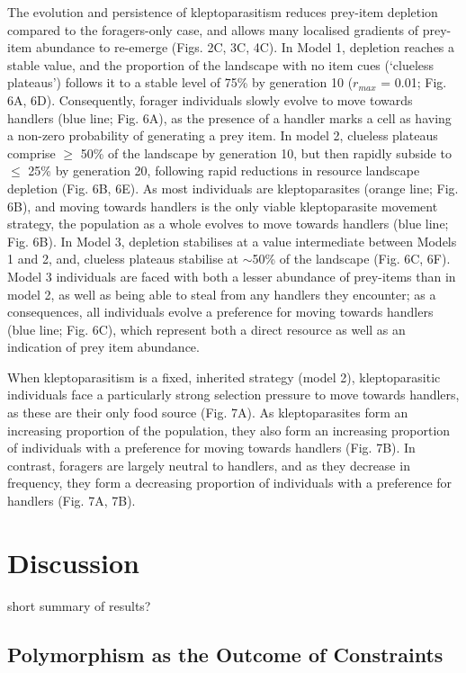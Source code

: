 \documentclass[11pt]{article}
\begin{document}
The evolution and persistence of kleptoparasitism reduces prey-item depletion compared to the foragers-only case, and allows many localised gradients of prey-item abundance to re-emerge (Figs. 2C, 3C, 4C).
In Model 1, depletion reaches a stable value, and the proportion of the landscape with no item cues (`clueless plateaus') follows it to a stable level of 75\% by generation 10 ($r_{max}$ = 0.01; Fig. 6A, 6D).
Consequently, forager individuals slowly evolve to move towards handlers (blue line; Fig. 6A), as the presence of a handler marks a cell as having a non-zero probability of generating a prey item.
%
In model 2, clueless plateaus comprise $\geq$ 50\% of the landscape by generation 10, but then rapidly subside to $\leq$ 25\% by generation 20, following rapid reductions in resource landscape depletion (Fig. 6B, 6E).
As most individuals are kleptoparasites (orange line; Fig. 6B), and moving towards handlers is the only viable kleptoparasite movement strategy, the population as a whole evolves to move towards handlers (blue line; Fig. 6B).
In Model 3, depletion stabilises at a value intermediate between Models 1 and 2, and, clueless plateaus stabilise at $\sim$50\% of the landscape (Fig. 6C, 6F).
Model 3 individuals are faced with both a lesser abundance of prey-items than in model 2, as well as being able to steal from any handlers they encounter; as a consequences, all individuals evolve a preference for moving towards handlers (blue line; Fig. 6C), which represent both a direct resource as well as an indication of prey item abundance.

When kleptoparasitism is a fixed, inherited strategy (model 2), kleptoparasitic individuals face a particularly strong selection pressure to move towards handlers, as these are their only food source (Fig. 7A).
As kleptoparasites form an increasing proportion of the population, they also form an increasing proportion of individuals with a preference for moving towards handlers (Fig. 7B).
In contrast, foragers are largely neutral to handlers, and as they decrease in frequency, they form a decreasing proportion of individuals with a preference for handlers (Fig. 7A, 7B).

\section{Discussion}

short summary of results?

\subsection{Polymorphism as the Outcome of Constraints}
\end{document}
